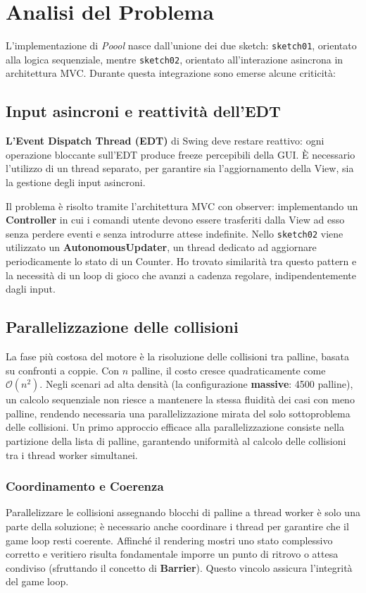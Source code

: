 \section{Analisi del Problema}
L'implementazione di \emph{Poool} nasce dall'unione dei due sketch: \texttt{sketch01}, orientato alla logica sequenziale, mentre \texttt{sketch02}, orientato all'interazione asincrona in architettura MVC. 
Durante questa integrazione sono emerse alcune criticità:

\subsection{Input asincroni e reattività dell'EDT}
\label{sec:analisi_edt}
\textbf{L'Event Dispatch Thread (EDT)} di Swing deve restare reattivo: ogni operazione bloccante sull'EDT produce freeze percepibili della GUI. È necessario l'utilizzo di un thread separato, per garantire sia l'aggiornamento della View, sia la gestione degli input asincroni.

Il problema è risolto tramite l'architettura MVC con observer: implementando un \textbf{Controller} in cui i comandi utente devono essere trasferiti dalla View ad esso senza perdere eventi e senza introdurre attese indefinite. 
Nello \texttt{sketch02} viene utilizzato un \textbf{AutonomousUpdater}, un thread dedicato ad aggiornare periodicamente lo stato di un Counter. Ho trovato similarità tra questo pattern e la necessità di un loop di gioco che avanzi a cadenza regolare, indipendentemente dagli input.

\subsection{Parallelizzazione delle collisioni}
La fase più costosa del motore è la risoluzione delle collisioni tra palline, basata su confronti a coppie. Con $n$ palline, il costo cresce quadraticamente come $ \mathcal{O}(n^2) $.
Negli scenari ad alta densità (la configurazione \textbf{massive}: 4500 palline), un calcolo sequenziale non riesce a mantenere la stessa fluidità dei casi con meno palline, rendendo necessaria una parallelizzazione mirata del solo sottoproblema delle collisioni.
Un primo approccio efficace alla parallelizzazione consiste nella partizione della lista di palline, garantendo uniformità al calcolo delle collisioni tra i thread worker simultanei.

\subsubsection*{Coordinamento e Coerenza}
Parallelizzare le collisioni assegnando blocchi di palline a thread worker è solo una parte della soluzione; è necessario anche coordinare i thread per garantire che il game loop resti coerente.
Affinché il rendering mostri uno stato complessivo corretto e veritiero risulta fondamentale imporre un punto di ritrovo o attesa condiviso (sfruttando il concetto di \textbf{Barrier}). Questo vincolo assicura l'integrità del game loop.

